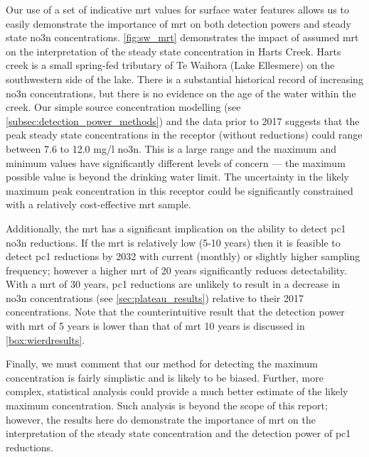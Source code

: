 Our use of a set of indicative \gls{mrt} values for surface water features allows us to easily demonstrate the importance of \gls{mrt} on both detection powers and steady state \gls{no3n} concentrations. \autoref{fig:sw_mrt} demonstrates the impact of assumed \gls{mrt} on the interpretation of the steady state concentration in Harts Creek.  Harts creek is a small spring-fed tributary of Te Waihora (Lake Ellesmere) on the southwestern side of the lake. There is a substantial historical record of increasing \gls{no3n} concentrations, but there is no evidence on the age of the water within the creek. Our simple source concentration modelling (see \autoref{subsec:detection_power_methods}) and the data prior to 2017 suggests that the peak steady state concentrations in the receptor (without reductions) could range between 7.6 to 12.0 mg/l \gls{no3n}.  This is a large range and the maximum and minimum values have significantly different levels of concern --- the maximum possible value is beyond the drinking water limit.  The uncertainty in the likely maximum peak concentration in this receptor could be significantly constrained with a relatively cost-effective \gls{mrt} sample.

Additionally, the \gls{mrt} has a significant implication on the ability to detect \gls{pc1} \gls{no3n} reductions. If the \gls{mrt} is relatively low (5-10 years) then it is feasible to detect \gls{pc1} reductions by 2032 with current (monthly) or slightly higher sampling frequency; however a higher \gls{mrt} of 20 years significantly reduces detectability. With a \gls{mrt} of 30 years, \gls{pc1} reductions are unlikely to result in a decrease in \gls{no3n} concentrations (see \autoref{sec:plateau_results}) relative to their 2017 concentrations. Note that the counterintuitive result that the detection power with \gls{mrt} of 5 years is lower than that of \gls{mrt} 10 years is discussed in \autoref{box:wierdresults}.

Finally, we must comment that our method for detecting the maximum concentration is fairly simplistic and is likely to be biased.  Further, more complex, statistical analysis could provide a much better estimate of the likely maximum concentration. Such analysis is beyond the scope of this report; however, the results here do demonstrate the importance of \gls{mrt} on the interpretation of the steady state concentration and the detection power of \gls{pc1} reductions.


